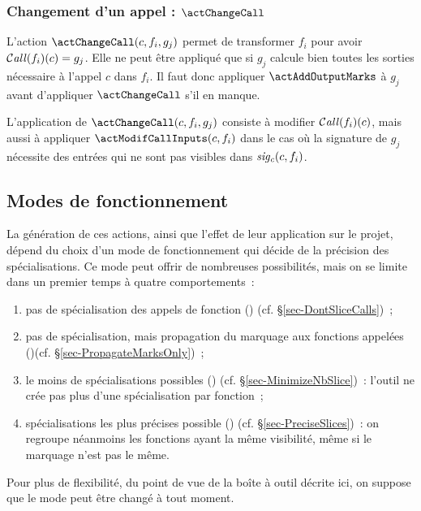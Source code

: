\subsubsection{Changement d'un appel : $\actChangeCall$}

L'action $\actChangeCall(c, f_i, g_j)$ permet de transformer $f_i$
pour avoir $\operatorname{\mathcal{C\mathit{all}}}(f_i)(c) = g_j$.  
Elle ne peut être appliqué que si
$g_j$ calcule bien toutes les sorties nécessaire à l'appel $c$ dans $f_i$.
Il faut donc appliquer $\actAddOutputMarks$ à $g_j$ avant d'appliquer
$\actChangeCall$ s'il en manque.
\bb

L'application de $\actChangeCall(c, f_i, g_j)$ consiste à modifier
$\operatorname{\mathcal{C\mathit{all}}}(f_i)(c)$, mais aussi à appliquer $\actModifCallInputs(c, f_i)$ dans le
cas où la signature de $g_j$ nécessite des entrées qui ne sont pas visibles dans
$\mathit{sig_c}(c, f_i)$.

\subsection{Modes de fonctionnement}\label{sec-modes}

La génération de ces actions, ainsi que l'effet de leur application sur le
projet, dépend du choix d'un mode de fonctionnement
qui décide de la précision des spécialisations. 
Ce mode peut offrir de nombreuses possibilités, 
mais on se limite dans un premier temps à quatre comportements~:
\begin{enumerate}
  \item pas de spécialisation des appels de fonction () 
    (cf. \S\ref{sec-DontSliceCalls})~;
  \item pas de spécialisation, mais propagation du marquage aux fonctions
    appelées ()(cf. \S\ref{sec-PropagateMarksOnly})~;
  \item le moins de spécialisations possibles 
    () (cf. \S\ref{sec-MinimizeNbSlice})~: 
    l'outil ne crée pas plus d'une spécialisation par fonction~;
  \item spécialisations les plus précises possible 
    () (cf. \S\ref{sec-PreciseSlices})~:
    on regroupe néanmoins les fonctions ayant la même visibilité,
    même si le marquage n'est pas le même.
\end{enumerate}

Pour plus de flexibilité,
du point de vue de la boîte à outil décrite ici, on suppose que le mode peut
être changé à tout moment.

